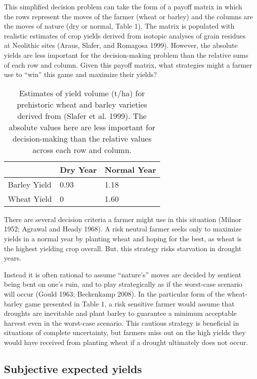 \documentclass[smallextended]{svjour3}       %
\begin{document}
This simplified decision problem can take the form of a payoff matrix in which the rows represent the moves of the farmer (wheat or barley) and the columns are the moves of nature (dry or normal, Table 1). The matrix is populated with realistic estimates of crop yields derived from isotopic analyses of grain residues at Neolithic sites (Araus, Slafer, and Romagosa 1999). However, the absolute yields are less important for the decision-making problem than the relative sums of each row and column. Given this payoff matrix, what strategies might a farmer use to ``win'' this game and maximize their yields?

\begin{table}
\centering
\caption{Estimates of yield volume (t/ha) for prehistoric wheat and barley varieties derived from (Slafer et al. 1999). The absolute values here are less important for decision-making than the relative values across each row and column.}
\begin{tabular}{|l|l|l|}
\hline
 & Dry Year & Normal Year \\ \hline
Barley Yield & 0.93 & 1.18 \\ \hline
Wheat Yield & 0 & 1.60 \\ \hline
\end{tabular}
\end{table}

There are several decision criteria a farmer might use in this situation (Milnor 1952; Agrawal and Heady 1968). A risk neutral farmer seeks only to maximize yields in a normal year by planting wheat and hoping for the best, as wheat is the highest yielding crop overall. But, this strategy risks starvation in drought years.

Instead it is often rational to assume ``nature's'' moves are decided by sentient being bent on one's ruin, and to play strategically as if the worst-case scenario will occur (Gould 1963; Beckenkamp 2008). In the particular form of the wheat-barley game presented in Table 1, a risk sensitive farmer would assume that droughts are inevitable and plant barley to guarantee a minimum acceptable harvest even in the worst-case scenario. This cautious strategy is beneficial in situations of complete uncertainty, but farmers miss out on the high yields they would have received from planting wheat if a drought ultimately does not occur.

\hypertarget{subjective-expected-yields}{%
\subsection{Subjective expected yields}\label{subjective-expected-yields}}
\end{document}
